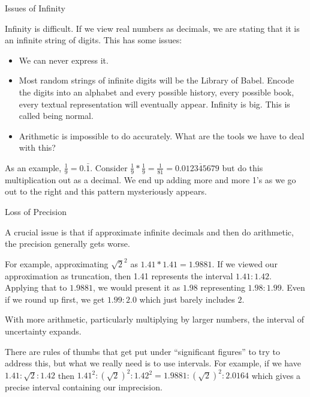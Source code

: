 \documentclass{beamer}
\begin{document}
\begin{frame}{Issues of Infinity}

    Infinity is difficult. If we view real numbers as decimals, we are stating that it is an infinite string of digits. This has some issues: 

    \begin{itemize}
        \item We can never express it. 
        \item Most random strings of infinite digits will be the Library of Babel. Encode the digits into an alphabet and every possible history, every possible book, every textual representation will eventually appear. Infinity is big. This is called being normal. 
        \item Arithmetic is impossible to do accurately. What are the tools we have to deal with this? 
    \end{itemize}

    As an example, $\frac{1}{9} = 0.\bar{1}$. Consider $\frac{1}{9}*\frac{1}{9} = \frac{1}{81} = 0.\overline{012345679}$ but do this multiplication out as a decimal. We end up adding more and more 1's as we go out to the right and this pattern mysteriously appears. 
    
\end{frame}

\begin{frame}{Loss of Precision}

    A crucial issue is that if approximate infinite decimals and then do arithmetic, the precision generally gets worse. 

    For example, approximating $\sqrt{2}^2$ as $1.41*1.41 = 1.9881$. If we viewed our approximation as truncation, then 1.41 represents the interval $1.41:1.42$.  Applying that to $1.9881$, we would present it as $1.98$ representing $1.98:1.99$. Even if we round up first, we get $1.99:2.0$ which just barely includes $2$.

    With more arithmetic, particularly multiplying by larger numbers, the interval of uncertainty expands. 

    There are rules of thumbs that get put under ``significant figures'' to try to address this, but what we really need is to use intervals.  For example, if we have $1.41:\sqrt{2}:1.42$ then $1.41^2 : (\sqrt{2})^2 : 1.42^2 = 1.9881 : (\sqrt{2})^2 : 2.0164$ which gives a precise interval containing our imprecision. 

    
\end{frame}
\end{document}
